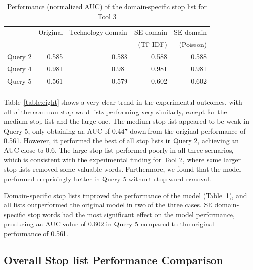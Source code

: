 \documentclass[conference]{IEEEtran}
\begin{document}
\begin{sloppy}
\begin{table}[]
\centering
\caption{Performance (normalized AUC) of the domain-specific stop list for Tool 3}
\begin{tabular}{lrrrr}
\toprule
    & Original & Technology domain & SE domain & SE domain \\
    & & & (TF-IDF) & (Poisson) \\
\midrule
Query 2 & 0.585    & \cellcolor{green}0.588             & \cellcolor{green}0.588              & \cellcolor{green}0.588                 \\
Query 4 & 0.981    & 0.981             & 0.981              & 0.981                 \\
Query 5 & 0.561    & \cellcolor{green}0.579             & \cellcolor{green}0.602              & \cellcolor{green}0.602                 \\
\bottomrule
\label{table:nine}
\end{tabular}
\end{table}

Table~\ref{table:eight} shows a very clear trend in the experimental outcomes, with all of the common stop word lists performing very similarly, except for the medium stop list and the large one. The medium stop list appeared to be weak in Query 5, only obtaining an AUC of 0.447 down from the original performance of 0.561. However, it performed the best of all stop lists in Query 2, achieving an AUC close to 0.6. The large stop list performed poorly in all three scenarios, which is consistent with the experimental finding for Tool 2, where some larger stop lists removed some valuable words. Furthermore, we found that the model performed surprisingly better in Query 5 without stop word removal.  
 
Domain-specific stop lists improved the performance of the model (Table~\ref{table:nine}), and all lists outperformed the original model in two of the three cases. SE domain-specific stop words had the most significant effect on the model performance, producing an AUC value of 0.602 in Query 5 compared to the original performance of 0.561. 

\subsection{Overall Stop list Performance Comparison}


\end{sloppy}
\end{document}
